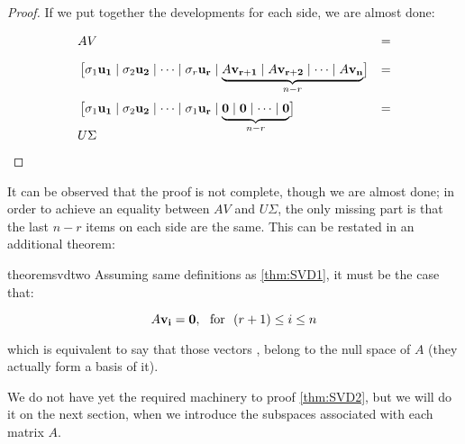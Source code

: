 \begin{proof}
If we put together the developments for each side, we are almost done:

\begin{align*}
  & A V &= \\[1.5ex]
  & \begin{bmatrix}
    \sigma_1\vec{u_1} \mid \sigma_2\vec{u_2} \mid \cdots \mid \sigma_r\vec{u_r} \mid
    \smash{\underbrace{A\vec{v_{r+1}} \mid A\vec{v_{r+2}} \mid \cdots \mid A\vec{v_{n}}}_{n-r}}
  \end{bmatrix}  &= \\[3.5ex]
  & \begin{bmatrix}
    \sigma_1\vec{u_1} \mid \sigma_2\vec{u_2} \mid \cdots \mid \sigma_1\vec{u_r} \mid
    \smash{\underbrace{\vec{0} \mid \vec{0} \mid \cdots \mid \vec{0}}_{n-r}}
  \end{bmatrix} &= \\[1.5ex]
  & U \Sigma
\end{align*}
\hfill

\end{proof}

It can be observed that the proof is not complete, though we are
almost done; in order to achieve an equality between $AV$ and
$U\Sigma$, the only missing part is that the last $n-r$ items on each
side are the same. This can be restated in an additional theorem: \\

\begin{restatable}{theorem}{svdtwo}
\label{thm:SVD2}
Assuming same definitions as \cref{thm:SVD1}, it must be the case that:

\[
A\vec{v_i} = \vec{0}, \textds{for} (r+1) \le i \le n
\]

which is equivalent to say that those vectors , belong to the
null space of $A$ (they actually form a basis of it).
\end{restatable}

We do not have yet the required machinery to proof 
\cref{thm:SVD2}, but we will do it on the next section, when we
introduce the subspaces associated with each matrix $A$. \\

